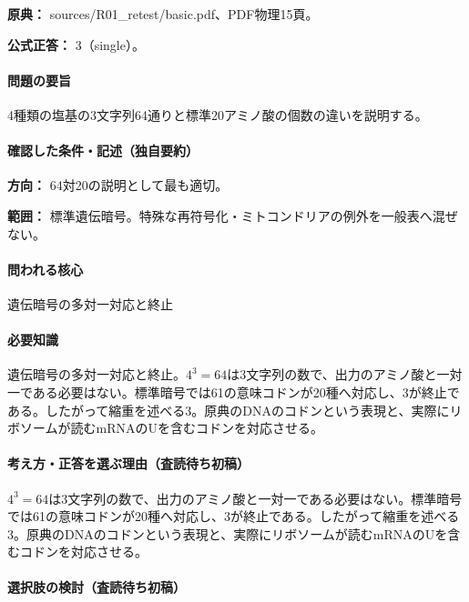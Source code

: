 \noindent\textbf{原典：} sources/R01\_retest/basic.pdf、PDF物理15頁。

\textbf{公式正答：} 3（single）。

\paragraph{問題の要旨} 4種類の塩基の3文字列64通りと標準20アミノ酸の個数の違いを説明する。

\paragraph{確認した条件・記述（独自要約）}\mbox{}\par

\noindent\textbf{方向：} 64対20の説明として最も適切。\par

\noindent\textbf{範囲：} 標準遺伝暗号。特殊な再符号化・ミトコンドリアの例外を一般表へ混ぜない。\par

\paragraph{問われる核心} 遺伝暗号の多対一対応と終止

\paragraph{必要知識} 遺伝暗号の多対一対応と終止。\(4^3=64\)は3文字列の数で、出力のアミノ酸と一対一である必要はない。標準暗号では61の意味コドンが20種へ対応し、3が終止である。したがって縮重を述べる3。原典のDNAのコドンという表現と、実際にリボソームが読むmRNAのUを含むコドンを対応させる。

\paragraph{考え方・正答を選ぶ理由（査読待ち初稿）} \(4^3=64\)は3文字列の数で、出力のアミノ酸と一対一である必要はない。標準暗号では61の意味コドンが20種へ対応し、3が終止である。したがって縮重を述べる3。原典のDNAのコドンという表現と、実際にリボソームが読むmRNAのUを含むコドンを対応させる。

\paragraph{選択肢の検討（査読待ち初稿）}\mbox{}\par

